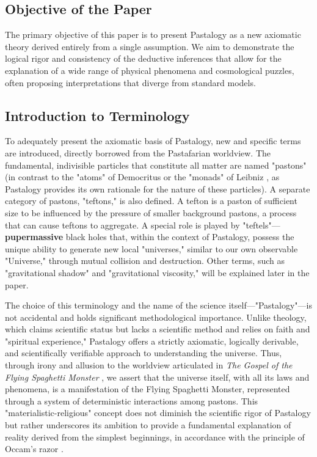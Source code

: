\documentclass[pdflatex,sn-mathphys-num,referee]{sn-jnl}
\begin{document}
\subsection{Objective of the Paper}\label{subsec:purpose}

The primary objective of this paper is to present Pastalogy as a new axiomatic theory derived entirely from a single assumption. We aim to demonstrate the logical rigor and consistency of the deductive inferences that allow for the explanation of a wide range of physical phenomena and cosmological puzzles, often proposing interpretations that diverge from standard models.

\subsection{Introduction to Terminology}\label{subsec:terminology}

To adequately present the axiomatic basis of Pastalogy, new and specific terms are introduced, directly borrowed from the Pastafarian worldview. The fundamental, indivisible particles that constitute all matter are named "pastons" (in contrast to the "atoms" of Democritus \cite{kirk1983-democritus} or the "monads" of Leibniz \cite{leibniz1989-monadology}, as Pastalogy provides its own rationale for the nature of these particles). A separate category of pastons, "teftons," is also defined. A tefton is a paston of sufficient size to be influenced by the pressure of smaller background pastons, a process that can cause teftons to aggregate. A special role is played by "teftels"--- \textbf{pupermassive} black holes that, within the context of Pastalogy, possess the unique ability to generate new local "universes," similar to our own observable "Universe," through mutual collision and destruction. Other terms, such as "gravitational shadow" and "gravitational viscosity," will be explained later in the paper.

The choice of this terminology and the name of the science itself---"Pastalogy"---is not accidental and holds significant methodological importance. Unlike theology, which claims scientific status but lacks a scientific method and relies on faith and "spiritual experience," Pastalogy offers a strictly axiomatic, logically derivable, and scientifically verifiable approach to understanding the universe. Thus, through irony and allusion to the worldview articulated in \textit{The Gospel of the Flying Spaghetti Monster} \cite{henderson2006}, we assert that the universe itself, with all its laws and phenomena, is a manifestation of the Flying Spaghetti Monster, represented through a system of deterministic interactions among pastons. This "materialistic-religious" concept does not diminish the scientific rigor of Pastalogy but rather underscores its ambition to provide a fundamental explanation of reality derived from the simplest beginnings, in accordance with the principle of Occam's razor \cite{occam-razor-sep}.
\end{document}
